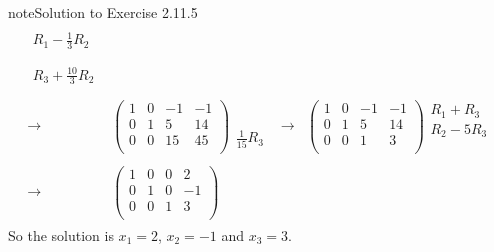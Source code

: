 \documentclass[letterpaper,10pt,english]{jupyterBook}
\begin{document}
\begin{sphinxadmonition}{note}{Solution to Exercise 2.11.5}
\begin{equation*}
\begin{split}
\begin{align*}
    \begin{array}{l} R_{1} - \frac{1}{3} R_{2} \\ \phantom{x} \\ R_{3} + \frac{10}{3} R_{2}\end{array} \\ \\ 
    \longrightarrow 
    & \left( \begin{array}{ccc|c} 
         1 & 0 & -1 & -1 \\ 
         0 & 1 & 5 & 14 \\ 
         0 & 0 & 15 & 45 \\ 
    \end{array} \right) 
    \begin{array}{l} \phantom{x} \\ \phantom{x} \\ \frac{1}{15} R_{3}\end{array} & 
    \longrightarrow 
    & \left( \begin{array}{ccc|c} 
         1 & 0 & -1 & -1 \\ 
         0 & 1 & 5 & 14 \\ 
         0 & 0 & 1 & 3 \\ 
    \end{array} \right) 
    \begin{array}{l} R_{1} + R_{3} \\ R_{2} - 5 R_{3} \\ \phantom{x} \end{array} \\ \\ 
    \longrightarrow 
    & \left( \begin{array}{ccc|c} 
         1 & 0 & 0 & 2 \\ 
         0 & 1 & 0 & -1 \\ 
         0 & 0 & 1 & 3 \\ 
    \end{array} \right) 
\end{align*} \end{split}
\end{equation*}
\sphinxAtStartPar
So the solution is \(x_{1} = 2\), \(x_{2} = -1\) and \(x_{3} = 3\).


\end{sphinxadmonition}
\end{document}
